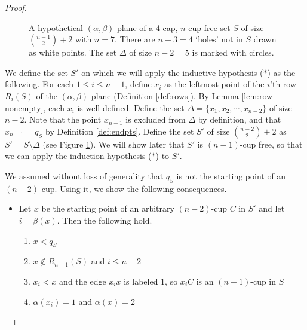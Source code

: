 \documentclass{amsart}
\theoremstyle{definition}
\numberwithin{thm}{section}
\begin{document}
\begin{proof}
\begin{center}
\begin{figure}[h]
\caption{A hypothetical $(\alpha, \beta)$-plane of a 4-cap, $n$-cup free set $S$ of size $\binom{n-1}{2} + 2$ with $n = 7$. There are $n - 3 = 4$ `holes' not in $S$ drawn as white points. The set $\Delta$ of size $n - 2 = 5$ is marked with circles.}
\label{fig:sprime}
\end{figure}
\end{center}

We define the set $S'$ on which we will apply the inductive hypothesis ($\ast$) as the following. 
For each $1 \leq i \leq n - 1$, define $x_i$ as the leftmost point of the $i$'th row $R_i(S)$ of the $(\alpha, \beta)$-plane (Definition \ref{def:rows}).
By Lemma \ref{lem:row-nonempty}, each $x_i$ is well-defined.
Define the set $\Delta = \{x_1, x_2, \cdots, x_{n-2}\}$ of size $n-2$.
Note that the point $x_{n-1}$ is excluded from $\Delta$ by definition,
and that $x_{n-1} = q_S$ by Definition \ref{def:endpts}.
Define the set $S'$ of size $\binom{n-2}{2} + 2$ as $S' = S \setminus \Delta$ (see Figure \ref{fig:sprime}).
We will show later that $S'$ is $(n-1)$-cup free, so that we can apply the induction hypothesis ($\ast$) to $S'$.

We assumed without loss of generality that $q_S$ is not the starting point of an $(n-2)$-cup. Using it, we show the following consequences.
\begin{itemize}
\item[($\ast\ast$)] Let $x$ be the starting point of an arbitrary $(n-2)$-cup $C$ in $S'$ and let $i = \beta(x)$. Then the following hold.
\begin{enumerate}
	\item $x < q_S$
	\item $x \not\in R_{n-1}(S)$ and $i \leq n - 2$
	\item $x_i < x$ and the edge $x_ix$ is labeled 1, so $x_iC$ is an $(n-1)$-cup in $S$
	\item $\alpha(x_i) = 1$ and $\alpha(x) = 2$
\end{enumerate}
\end{itemize}


\end{proof}
\end{document}
